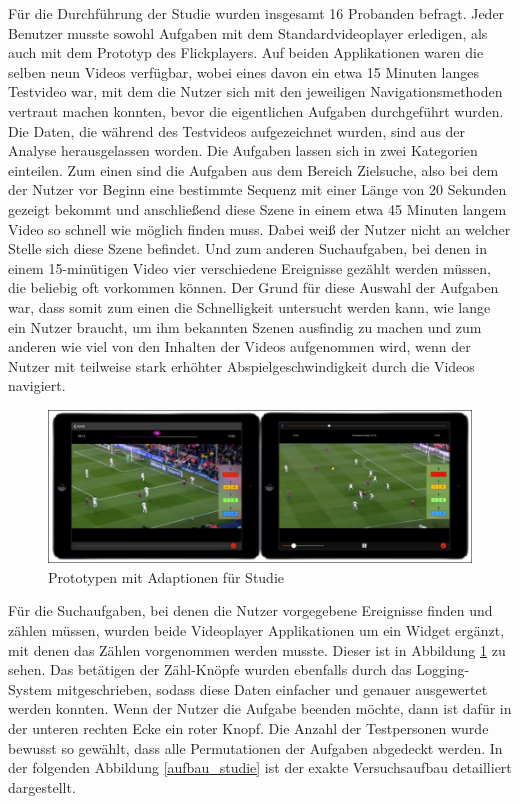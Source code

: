 \documentclass[11pt,a4paper]{report}
\begin{document}
Für die Durchführung der Studie wurden insgesamt 16 Probanden befragt. Jeder Benutzer musste sowohl Aufgaben mit dem Standardvideoplayer erledigen, als auch mit dem Prototyp des Flickplayers. Auf beiden Applikationen waren die selben neun Videos verfügbar, wobei eines davon ein etwa 15 Minuten langes Testvideo war, mit dem die Nutzer sich mit den jeweiligen Navigationsmethoden vertraut machen konnten, bevor die eigentlichen Aufgaben durchgeführt wurden. Die Daten, die während des Testvideos aufgezeichnet wurden, sind aus der Analyse herausgelassen worden. Die Aufgaben lassen sich in zwei Kategorien einteilen. Zum einen sind die Aufgaben aus dem Bereich Zielsuche, also bei dem der Nutzer vor Beginn eine bestimmte Sequenz mit einer Länge von 20 Sekunden gezeigt bekommt und anschließend diese Szene in einem etwa 45 Minuten langem Video so schnell wie möglich finden muss. Dabei weiß der Nutzer nicht an welcher Stelle sich diese Szene befindet. Und zum anderen Suchaufgaben, bei denen in einem 15-minütigen Video vier verschiedene Ereignisse gezählt werden müssen, die beliebig oft vorkommen können. Der Grund für diese Auswahl der Aufgaben war, dass somit zum einen die Schnelligkeit untersucht werden kann, wie lange ein Nutzer braucht, um ihm bekannten Szenen ausfindig zu machen und zum anderen wie viel von den Inhalten der Videos aufgenommen wird, wenn der Nutzer mit teilweise stark erhöhter Abspielgeschwindigkeit durch die Videos navigiert.
\begin{figure}[h]
\begin{center}
\includegraphics[scale=0.9]{./images/31.png}
\caption{Prototypen mit Adaptionen für Studie}
\label{prototyp_flickplayer_studie}
\end{center}
\end{figure}
Für die Suchaufgaben, bei denen die Nutzer vorgegebene Ereignisse finden und zählen müssen, wurden beide Videoplayer Applikationen um ein Widget ergänzt, mit denen das Zählen vorgenommen werden musste. Dieser ist in Abbildung \ref{prototyp_flickplayer_studie} zu sehen. Das betätigen der Zähl-Knöpfe wurden ebenfalls durch das Logging-System mitgeschrieben, sodass diese Daten einfacher und genauer ausgewertet werden konnten. Wenn der Nutzer die Aufgabe beenden möchte, dann ist dafür in der unteren rechten Ecke ein roter Knopf. Die Anzahl der Testpersonen wurde bewusst so gewählt, dass alle Permutationen der Aufgaben abgedeckt werden. In der folgenden Abbildung \ref{aufbau_studie} ist der exakte Versuchsaufbau detailliert dargestellt.
\end{document}
